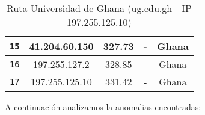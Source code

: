 \begin{table}[ht]
\begin{center}
\begin{tabular}{|c|c|c|c|c|}
    \texttt{15} & 41.204.60.150   & 327.73            & -                          & Ghana                          \\ \hline
    \texttt{16} & 197.255.127.2   & 328.85            & -                          & Ghana                          \\ \hline
    \texttt{17} & 197.255.125.10  & 331.42            & -                          & Ghana                          \\ \hline
    \end{tabular}
    \caption{Ruta Universidad de Ghana (ug.edu.gh  - IP 197.255.125.10)}
\end{center}
\end{table}

A continuación analizamos la anomalias encontradas:


\begin{figure}[h]
    \centering
\end{figure}
